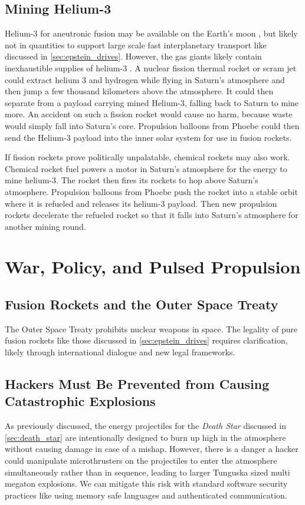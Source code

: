 \documentclass{article}
\begin{document}
\subsection{Mining Helium-3} \label{sec:mining_helium_3}
Helium-3 for aneutronic fusion may be available on the Earth's moon \cite{esa_helium3_mining}, but likely not in quantities to support large scale fast interplanetary transport like discussed in \autoref{sec:epstein_drives}.   However, the gas giants likely contain inexhaustible supplies of helium-3 \cite{palaszewski2005atmospheric}.   A nuclear fission thermal rocket or scram jet could extract helium 3 and hydrogen while flying in Saturn's atmosphere and then jump a few thousand kilometers above the atmosphere.  It could then separate from a payload carrying mined Helium-3, falling back to Saturn to mine more.  An accident on such a fission rocket would cause no harm, because waste would simply fall into Saturn's core. Propulsion balloons from Phoebe could then send the Helium-3 payload into the inner solar system for use in fusion rockets.  

If fission rockets prove politically unpalatable, chemical rockets may also work.   Chemical rocket fuel powers a motor in Saturn's atmosphere for the energy to mine helium-3.  The rocket then fires its rockets to hop above Saturn's atmosphere.   Propulsion balloons from Phoebe push the rocket into a stable orbit where it is refueled and releases its helium-3 payload.  Then new propulsion rockets decelerate the refueled rocket so that it falls into Saturn's atmosphere for another mining round.


\section{War, Policy, and Pulsed Propulsion}
\subsection{Fusion Rockets and the Outer Space Treaty}
The Outer Space Treaty \cite{outer_space_treaty} prohibits nuclear weapons in space. The legality of pure fusion rockets like those discussed in \autoref{sec:epstein_drives} requires clarification, likely through international dialogue and new legal frameworks.

\subsection{Hackers Must Be Prevented from Causing Catastrophic Explosions}
As previously discussed, the energy projectiles for the \textit{Death Star} discussed in \autoref{sec:death_star} are intentionally designed to burn up high in the atmosphere without causing damage in case of a mishap.  However, there is a danger a hacker could manipulate microthrusters on the projectiles to enter the atmosphere simultaneously rather than in sequence, leading to larger Tunguska \cite{longo2007tunguska} sized multi megaton explosions.  We can mitigate this risk with standard software security practices like using memory safe languages and authenticated communication.
\end{document}
